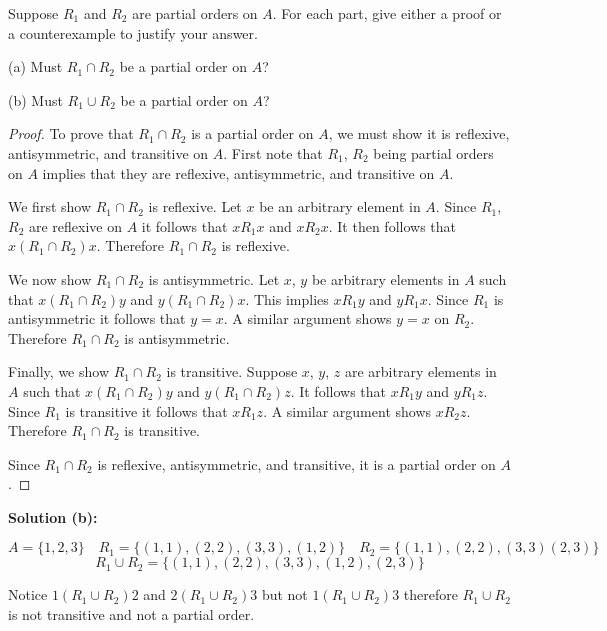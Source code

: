 \begin{tcolorbox}[title=Problem 6, breakable]
    Suppose $R_1$ and $R_2$ are partial orders on $A$.
    For each part, give either a proof or a counterexample to justify your answer.

    (a) Must $R_1 \cap R_2$ be a partial order on $A$?

    (b) Must $R_1 \cup R_2$ be a partial order on $A$?
\end{tcolorbox}

\begin{proof}
    To prove that $R_1 \cap R_2$ is a partial order on $A$,
        we must show it is reflexive, antisymmetric, and transitive on $A$.
    First note that $R_1$, $R_2$ being partial orders on $A$ implies that 
        they are reflexive, antisymmetric, and transitive on $A$.

    We first show $R_1 \cap R_2$ is reflexive.
    Let $x$ be an arbitrary element in $A$.
    Since $R_1$, $R_2$ are reflexive on $A$ it follows that $xR_1x$ and $xR_2x$.
    It then follows that $x(R_1 \cap R_2)x$.
    Therefore $R_1 \cap R_2$ is reflexive.

    We now show $R_1 \cap R_2$ is antisymmetric.
    Let $x$, $y$ be arbitrary elements in $A$ such that $x(R_1 \cap R_2)y$
        and $y(R_1 \cap R_2)x$.
    This implies $xR_1y$ and $yR_1x$.
    Since $R_1$ is antisymmetric it follows that $y = x$.
    A similar argument shows $y = x$ on $R_2$.
    Therefore $R_1 \cap R_2$ is antisymmetric.

    Finally, we show $R_1 \cap R_2$ is transitive.
    Suppose $x$, $y$, $z$ are arbitrary elements in $A$ such that $x(R_1 \cap R_2)y$
        and $y(R_1 \cap R_2)z$.
    It follows that $xR_1y$ and $yR_1z$.
    Since $R_1$ is transitive it follows that $xR_1z$.
    A similar argument shows $xR_2z$.
    Therefore $R_1 \cap R_2$ is transitive.

    Since $R_1 \cap R_2$ is reflexive, antisymmetric, and transitive,
         it is a partial order on $A$.
\end{proof}

\textbf{Solution (b):}

\[A = \{1, 2, 3\} \quad R_1 = \{(1, 1), (2, 2), (3, 3), (1, 2)\} \quad R_2 = \{(1, 1), (2, 2), (3, 3) (2, 3)\}\]
\[R_1 \cup R_2 = \{(1, 1), (2, 2), (3, 3), (1, 2), (2, 3)\}\]

Notice $1(R_1 \cup R_2)2$ and $2(R_1 \cup R_2)3$ but not $1(R_1 \cup R_2)3$
    therefore $R_1 \cup R_2$ is not transitive and not a partial order.

